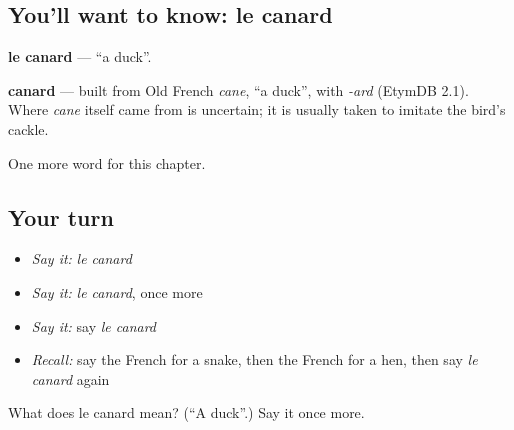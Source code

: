 \subsection*{You'll want to know: le canard}
\textbf{le canard} — \textquotedblleft{}a duck\textquotedblright{}.

\begin{cousinweb}
\textbf{canard} — built from Old French \emph{cane}, \textquotedblleft{}a duck\textquotedblright{}, with \emph{-ard} (EtymDB 2.1). Where \emph{cane} itself came from is uncertain; it is usually taken to imitate the bird's cackle.
\end{cousinweb}

\begin{grammarlens}[title={What you've built}]
One more word for this chapter.
\end{grammarlens}

\subsection*{Your turn}
\begin{itemize}
\raggedright
  \item \emph{Say it:} \emph{le canard}
  \item \emph{Say it:} \emph{le canard}, once more
  \item \emph{Say it:} say \emph{le canard}
  \item \emph{Recall:} say the French for a snake, then the French for a hen, then say \emph{le canard} again
\end{itemize}

\begin{tcolorbox}[breakable,colback=teal!4,colframe=teal!35!black,title={Before you move on}]
What does le canard mean? (\textquotedblleft{}A duck\textquotedblright{}.) Say it once more.
\end{tcolorbox}
